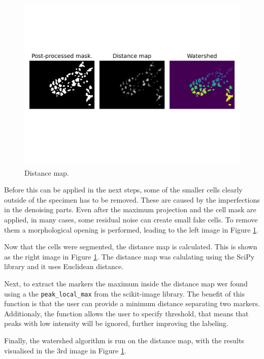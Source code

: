 \documentclass[
  digital,     %
  oneside,     %
  nosansbold,  %
  nocolorbold, %
  lof,         %
  lot,         %
]{fithesis4}
\begin{document}
\begin{figure}
    \begin{center}
        \includegraphics[width=\linewidth]{resources/distance_map.png}
    \end{center}
    \caption{Distance map.}
    \label{fig:distance_map}
\end{figure}

Before this can be applied in the next steps, some of the smaller cells clearly
outside of the specimen has to be removed. These are caused by the imperfections
in the denoising parts. Even after the maximum projection and the cell mask are
applied, in many cases, some residual noise can create small fake cells. To
remove them a morphological opening is performed, leading to the left image in
Figure \ref{fig:distance_map}.

Now that the cells were segmented, the distance map is calculated. This is shown
as the right image in Figure \ref{fig:distance_map}. The distance map was
calulating using the SciPy library and it uses Euclidean distance.

Next, to extract the markers the maximum inside the distance map wer found using
a the \texttt{peak\_local\_max} from the scikit-image library. The benefit of
this function is that the user can provide a minimum distance separating two
markers. Additionaly, the function allows the user to specify threshold, that
means that peaks with low intensity will be ignored, further improving the
labeling.

Finally, the watershed algorithm is run on the distance map, with the results
visualised in the 3rd image in Figure \ref{fig:distance_map}.
\end{document}
